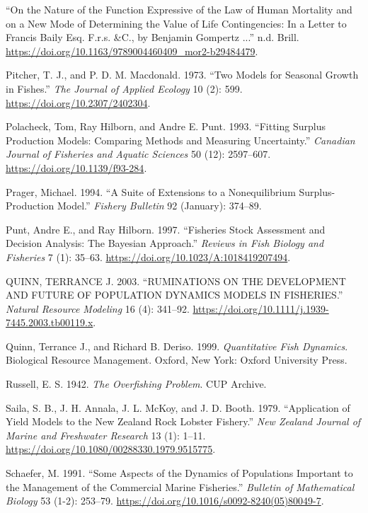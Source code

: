 \documentclass[
  lang=cn,
  11pt,
  scheme=chinese,
  chinesefont=nofont,
  citestyle=gb7714-2015,
  bibstyle=gb7714-2015]{elegantbook}
\newlength{\cslhangindent}
\newenvironment{CSLReferences}[2] %
 {\begin{list}{}{%
  \setlength{\itemindent}{0pt}
  \setlength{\leftmargin}{0pt}
  \setlength{\parsep}{0pt}
  \ifodd #1
   \setlength{\leftmargin}{\cslhangindent}
   \setlength{\itemindent}{-1\cslhangindent}
  \fi
  \setlength{\itemsep}{#2\baselineskip}}}
 {\end{list}}
\begin{document}
\begin{CSLReferences}{1}{0}
{``On the Nature of the Function Expressive of the Law of Human Mortality and on a New Mode of Determining the Value of Life Contingencies: In a Letter to Francis Baily Esq. F.r.s. \&C., by Benjamin Gompertz ...''} n.d. Brill. \url{https://doi.org/10.1163/9789004460409_mor2-b29484479}.

Pitcher, T. J., and P. D. M. Macdonald. 1973. {``Two Models for Seasonal Growth in Fishes.''} \emph{The Journal of Applied Ecology} 10 (2): 599. \url{https://doi.org/10.2307/2402304}.

Polacheck, Tom, Ray Hilborn, and Andre E. Punt. 1993. {``Fitting Surplus Production Models: Comparing Methods and Measuring Uncertainty.''} \emph{Canadian Journal of Fisheries and Aquatic Sciences} 50 (12): 2597--607. \url{https://doi.org/10.1139/f93-284}.

Prager, Michael. 1994. {``A Suite of Extensions to a Nonequilibrium Surplus-Production Model.''} \emph{Fishery Bulletin} 92 (January): 374--89.

Punt, Andre E., and Ray Hilborn. 1997. {``Fisheries Stock Assessment and Decision Analysis: The Bayesian Approach.''} \emph{Reviews in Fish Biology and Fisheries} 7 (1): 35--63. \url{https://doi.org/10.1023/A:1018419207494}.

QUINN, TERRANCE J. 2003. {``RUMINATIONS ON THE DEVELOPMENT AND FUTURE OF POPULATION DYNAMICS MODELS IN FISHERIES.''} \emph{Natural Resource Modeling} 16 (4): 341--92. \url{https://doi.org/10.1111/j.1939-7445.2003.tb00119.x}.

Quinn, Terrance J., and Richard B. Deriso. 1999. \emph{Quantitative Fish Dynamics}. Biological Resource Management. Oxford, New York: Oxford University Press.

Russell, E. S. 1942. \emph{The Overfishing Problem}. CUP Archive.

Saila, S. B., J. H. Annala, J. L. McKoy, and J. D. Booth. 1979. {``Application of Yield Models to the New Zealand Rock Lobster Fishery.''} \emph{New Zealand Journal of Marine and Freshwater Research} 13 (1): 1--11. \url{https://doi.org/10.1080/00288330.1979.9515775}.

Schaefer, M. 1991. {``Some Aspects of the Dynamics of Populations Important to the Management of the Commercial Marine Fisheries.''} \emph{Bulletin of Mathematical Biology} 53 (1-2): 253--79. \url{https://doi.org/10.1016/s0092-8240(05)80049-7}.


\end{CSLReferences}
\end{document}
